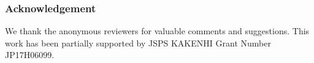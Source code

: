 \documentclass[runningheads]{llncs}
\begin{document}




\subsubsection*{Acknowledgement}
We thank the anonymous reviewers for valuable comments and suggestions. This work has been partially supported by JSPS KAKENHI Grant Number JP17H06099.

% 
%
%
% 
% 

\printbibliography








\end{document}

